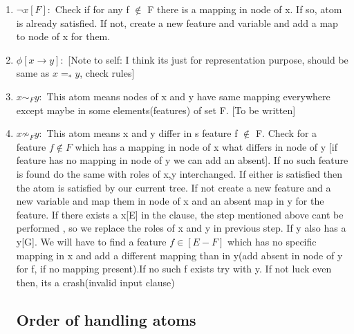 \documentclass[12pt]{article}
\begin{document}
\begin{enumerate}
  \item $\lnot x[F] :$ Check if for any f $\not\in$ F there is a mapping in node of x. If so, atom is already satisfied. If not, create a new feature and variable and add a map to node of x for them.
  
  \item $\phi [x\to y] :$ [Note to self: I think its just for representation purpose, should be same as $x =_* y$, check rules]
  
  \item $x \sim_F y :$  This atom means nodes of x and y have same mapping everywhere except maybe in some elements(features) of set F. [To be written]
  
  \item $x \not\sim_F y :$ This atom means x and y differ in s feature f $\not\in$ F. Check for a feature $f\not\in F$ which has a mapping in node of x what differs in node of y [if feature has no mapping in node of y we can add an absent]. If no such feature is found do the same with roles of x,y interchanged. If either is satisfied then the atom is satisfied by our current tree. If not create a new feature and a new variable and map them in node of x and an absent map in y for the feature. If there exists a x[E] in the clause, the step mentioned above cant be performed , so we replace the roles of x and y in previous step. If y also has a y[G]. We will have to find a feature $f \in [E-F]$ which has no specific mapping in x and add a different mapping than in y(add absent in node of y for f, if no mapping present).If no such f exists try with y. If not luck even then, its a crash(invalid input clause) 
\subsection{Order of handling atoms}
\end{enumerate}
\end{document}
